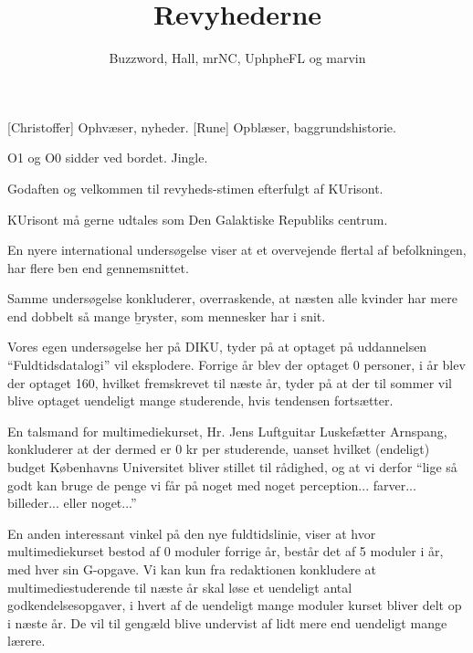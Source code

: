 \documentclass[a4paper]{article}
\title{Revyhederne}
\author{Buzzword, Hall, mrNC, UphpheFL og marvin}
\begin{document}
\maketitle

\begin{roles}
[Christoffer] Ophvæser, nyheder.
[Rune] Opblæser, baggrundshistorie.
\end{roles}

\begin{props}
\end{props}

\begin{sketch}

\scene O1 og O0 sidder ved bordet.
\scene Jingle.

 Godaften og velkommen til revyheds-stimen efterfulgt
af KUrisont.

\scene KUrisont må gerne udtales som Den Galaktiske Republiks centrum.



En nyere international undersøgelse viser at et overvejende flertal
af befolkningen, har flere ben end gennemsnittet.

Samme undersøgelse konkluderer, overraskende, at næsten alle
kvinder har mere end dobbelt så mange \b{bryster}, som mennesker har i snit.

 Vores egen undersøgelse her på DIKU, tyder på at optaget på
uddannelsen ``Fuldtidsdatalogi'' vil eksplodere. Forrige år blev der optaget 0
personer, i år blev der optaget 160, hvilket fremskrevet til næste år, tyder
på at der til sommer vil blive optaget uendeligt mange studerende, hvis
tendensen fortsætter.

 En talsmand for multimediekurset, Hr. Jens Luftguitar Luskefætter
Arnspang, konkluderer at der dermed er 0 kr per studerende, uanset hvilket
(endeligt) budget Københavns Universitet bliver stillet til rådighed, og at
vi derfor ``lige så godt kan bruge de penge vi får på noget med noget
perception... farver... billeder... eller noget...''

En anden interessant vinkel på den nye fuldtidslinie, viser at
hvor multimediekurset bestod af 0 moduler forrige år, består det af 5
moduler i år, med hver sin G-opgave. Vi kan kun fra redaktionen konkludere
at multimediestuderende til næste år skal løse et uendeligt antal
godkendelsesopgaver, i hvert af de uendeligt mange moduler kurset bliver
delt op i næste år. De vil til gengæld blive undervist af lidt mere end
uendeligt mange lærere.


\end{sketch}
\end{document}
